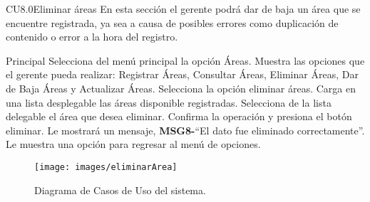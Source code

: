 

	\begin{UseCase}{CU8.0}{Eliminar áreas}{
		En esta sección el gerente podrá dar de baja un área que se encuentre registrada, ya sea a 				causa de posibles errores como duplicación de contenido o error a la hora del registro.
	}
	\end{UseCase}

\begin{UCtrayectoria}{Principal}
		\UCpaso[\UCactor] Selecciona del menú principal la opción Áreas.
		\UCpaso Muestra las opciones que el gerente pueda realizar: Registrar Áreas, Consultar Áreas, Eliminar Áreas, Dar de Baja Áreas y Actualizar Áreas.
		\UCpaso[\UCactor] Selecciona la opción eliminar áreas.
		\UCpaso Carga en una lista desplegable las áreas disponible registradas.
		\UCpaso[\UCactor] Selecciona de la lista delegable el área que desea eliminar.
		\UCpaso[\UCactor] Confirma la operación y presiona el botón eliminar.
		\UCpaso Le mostrará un mensaje, {\bf MSG8-}``El dato fue eliminado correctamente''.
		\UCpaso Le muestra una opción para regresar al menú de opciones.
	\end{UCtrayectoria}

\begin{figure}[htbp!]
		\centering
			\texttt{[image: images/eliminarArea]}
		\caption{Diagrama de Casos de Uso del sistema.}
	\end{figure}